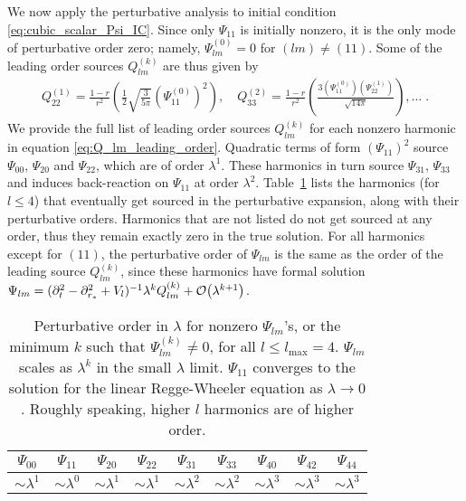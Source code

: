 \documentclass[reprint,aps,physrev,superscriptaddress,10pt,notitlepage,prd,nofootinbib,onecolumn]{revtex4-2}
\newcommand{\Tref}[1]{Table~\ref{#1}}
\begin{document}
We now apply the perturbative analysis to initial condition \eqref{eq:cubic_scalar_Psi_IC}.
Since only $\Psi_{11}$ is initially nonzero, it is the only mode of perturbative order zero; namely, $\Psi_{lm}^{(0)} = 0$ for $(lm) \neq (11)$.
Some of the leading order sources $Q_{lm}^{(k)}$ are thus given by
\begin{align}
  Q_{22}^{(1)} = \frac{1-r}{r^2} \left( \frac{1}{2} \sqrt{\frac{3}{5 \pi }} (\Psi^{(0)}_{11})^2 \right),\quad
  Q_{33}^{(2)} = \frac{1-r}{r^2} \left( \frac{3 (\Psi^{(0)}_{11}) (\Psi^{(1)}_{22})}{\sqrt{14 \pi }} \right),\hdots \;.
\end{align}
We provide the full list of leading order sources $Q_{lm}^{(k)}$ for each nonzero harmonic in equation \eqref{eq:Q_lm_leading_order}.
Quadratic terms of form $(\Psi_{11})^2$ source $\Psi_{00}$, $\Psi_{20}$ and $\Psi_{22}$, which are of order $\lambda^1$.
These harmonics in turn source $\Psi_{31}$, $\Psi_{33}$ and induces back-reaction on $\Psi_{11}$ at order $\lambda^2$.
\Tref{tab:Psi_perturbative_orders} lists the harmonics (for $l \leq 4$) that eventually get sourced in the perturbative expansion, along with their perturbative orders.
Harmonics that are not listed do not get sourced at any order, thus they remain exactly zero in the true solution.
For all harmonics except for $(11)$, the perturbative order of $\Psi_{lm}$ is the same as the order of the leading source $Q_{lm}^{(k)}$, since these harmonics have formal solution $\Psi_{lm} = (\partial_t^2 -  \partial_{r_*}^2 + V_l)^{-1} \lambda^k Q_{lm}^{(k)} + \order{\lambda^{k+1}}$.
\begin{table}[h]
  \centering
  \begin{tabular}{|c|c|c|c|c|c|c|c|c|}
    \hline
    $\Psi_{00}$ & $\Psi_{11}$ & $\Psi_{20}$ & $\Psi_{22}$ & $\Psi_{31}$ & $\Psi_{33}$ & $\Psi_{40}$ & $\Psi_{42}$ & $\Psi_{44}$ \\
    \hline
    $\sim\lambda^1$ & $\sim\lambda^0$ & $\sim\lambda^1$ & $\sim\lambda^1$ & $\sim\lambda^2$ & $\sim\lambda^2$ & $\sim\lambda^3$ & $\sim\lambda^3$ & $\sim\lambda^3$ \\
    \hline
  \end{tabular}
  \caption{Perturbative order in $\lambda$ for nonzero $\Psi_{lm}$'s, or the minimum $k$ such that $\Psi_{lm}^{(k)} \neq 0$, for all $l \leq l_{\mathrm{max}} = 4$.
    $\Psi_{lm}$ scales as $\lambda^k$ in the small $\lambda$ limit.
    $\Psi_{11}$ converges to the solution for the linear Regge-Wheeler equation as $\lambda \to 0$.
    Roughly speaking, higher $l$ harmonics are of higher order.
  }
  \label{tab:Psi_perturbative_orders}
\end{table}
\end{document}
